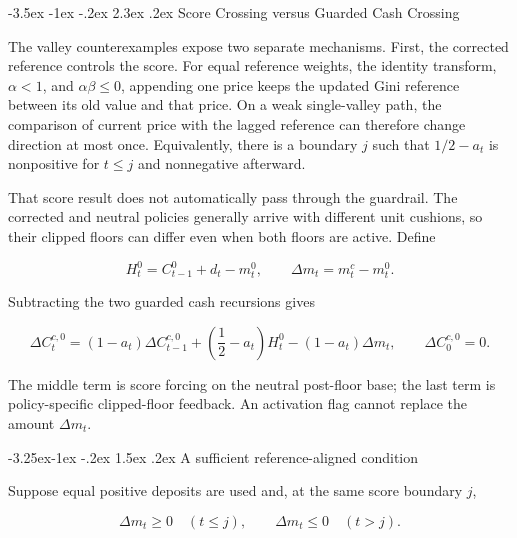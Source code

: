 \documentclass[12pt,a4paper,oneside]{report}
\makeatletter
\renewcommand\section{\@startsection{section}{1}{\z@}%
  {-3.5ex \@plus -1ex \@minus -.2ex}%
  {2.3ex \@plus .2ex}%
  {\normalfont\fontsize{14}{17}\selectfont\bfseries}}
\renewcommand\subsection{\@startsection{subsection}{2}{\z@}%
  {-3.25ex\@plus -1ex \@minus -.2ex}%
  {1.5ex \@plus .2ex}%
  {\normalfont\fontsize{12}{15}\selectfont\bfseries}}
\makeatother
\begin{document}
\section{Score Crossing versus Guarded Cash Crossing}
\label{sec:guardrail-feedback}

The valley counterexamples expose two separate mechanisms. First, the
corrected reference controls the score. For equal reference weights, the
identity transform, $\alpha<1$, and $\alpha\beta\leq0$, appending one price
keeps the updated Gini reference between its old value and that price. On a
weak single-valley path, the comparison of current price with the lagged
reference can therefore change direction at most once. Equivalently, there is
a boundary $j$ such that $1/2-a_t$ is nonpositive for $t\leq j$ and
nonnegative afterward.

That score result does not automatically pass through the guardrail. The
corrected and neutral policies generally arrive with different unit cushions,
so their clipped floors can differ even when both floors are active. Define

\begin{equation}
  H_t^0=C_{t-1}^0+d_t-m_t^0,
  \qquad
  \Delta m_t=m_t^c-m_t^0.
  \label{eq:cash-crossing-components}
\end{equation}

Subtracting the two guarded cash recursions gives

\begin{equation}
  \boxed{
  \Delta C_t^{c,0}
  =(1-a_t)\Delta C_{t-1}^{c,0}
   +\left(\frac12-a_t\right)H_t^0
   -(1-a_t)\Delta m_t,}
  \qquad \Delta C_0^{c,0}=0.
  \label{eq:guarded-cash-recurrence}
\end{equation}

The middle term is score forcing on the neutral post-floor base; the last term
is policy-specific clipped-floor feedback. An activation flag cannot replace
the amount $\Delta m_t$.

\subsection{A sufficient reference-aligned condition}
\label{thm:cash-single-crossing}

Suppose equal positive deposits are used and, at the same score boundary $j$,

\begin{equation}
  \Delta m_t\geq0\quad(t\leq j),
  \qquad
  \Delta m_t\leq0\quad(t>j).
  \label{eq:reference-aligned-feedback}
\end{equation}
\end{document}
